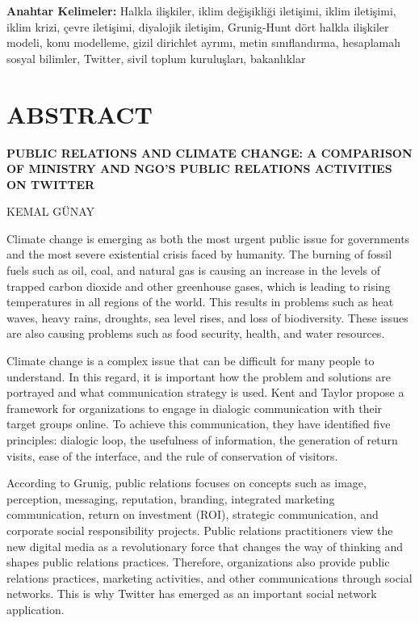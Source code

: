 \documentclass[
]{book}
\begin{document}
\textbf{Anahtar Kelimeler:} Halkla ilişkiler, iklim değişikliği iletişimi, iklim iletişimi, iklim krizi, çevre iletişimi, diyalojik iletişim, Grunig-Hunt dört halkla ilişkiler modeli, konu modelleme, gizil dirichlet ayrımı, metin sınıflandırma, hesaplamalı sosyal bilimler, Twitter, sivil toplum kuruluşları, bakanlıklar

\hypertarget{abstract}{%
\chapter*{ABSTRACT}\label{abstract}}

\textbf{PUBLIC RELATIONS AND CLIMATE CHANGE: A COMPARISON OF MINISTRY AND NGO'S PUBLIC RELATIONS ACTIVITIES ON TWITTER}

KEMAL GÜNAY

Climate change is emerging as both the most urgent public issue for governments and the most severe existential crisis faced by humanity. The burning of fossil fuels such as oil, coal, and natural gas is causing an increase in the levels of trapped carbon dioxide and other greenhouse gases, which is leading to rising temperatures in all regions of the world. This results in problems such as heat waves, heavy rains, droughts, sea level rises, and loss of biodiversity. These issues are also causing problems such as food security, health, and water resources.

Climate change is a complex issue that can be difficult for many people to understand. In this regard, it is important how the problem and solutions are portrayed and what communication strategy is used. Kent and Taylor propose a framework for organizations to engage in dialogic communication with their target groups online. To achieve this communication, they have identified five principles: dialogic loop, the usefulness of information, the generation of return visits, ease of the interface, and the rule of conservation of visitors.

According to Grunig, public relations focuses on concepts such as image, perception, messaging, reputation, branding, integrated marketing communication, return on investment (ROI), strategic communication, and corporate social responsibility projects. Public relations practitioners view the new digital media as a revolutionary force that changes the way of thinking and shapes public relations practices. Therefore, organizations also provide public relations practices, marketing activities, and other communications through social networks. This is why Twitter has emerged as an important social network application.
\end{document}
